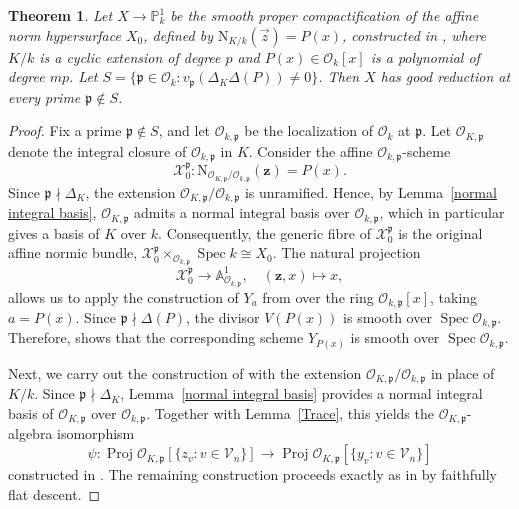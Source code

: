 \documentclass[10pt]{amsart}
\theoremstyle{plain}
\newtheorem{theorem}[thm]{Theorem}
\theoremstyle{definition}
\newcommand{\Nm}{\mathrm{N}}
\begin{document}
\begin{theorem}\label{places of good reduction for normic bundles}
    Let $X \to \mathbb{P}^1_k$ be the smooth proper compactification of the affine norm hypersurface $X_0$, defined by $\Nm_{K/k}(\vec{z})=P(x)$, constructed in \cite[Theorem~1.1]{AB}, where $K/k$ is a cyclic extension of degree $p$ and $P(x)\in \mathcal{O}_k[x]$ is a polynomial of degree $mp$. Let $S=\{\mathfrak{p}\in \mathcal{O}_k : v_{\mathfrak{p}}(\Delta_K\Delta(P))\neq 0\}$. Then $X$ has good reduction at every prime $\mathfrak{p}\notin S$.
\end{theorem}
\begin{proof}
Fix a prime \(\mathfrak p\notin S\), and let
\(\mathcal{O}_{k,\mathfrak p}\) be the localization of
\(\mathcal{O}_k\) at \(\mathfrak p\). Let
\(\mathcal{O}_{K,\mathfrak p}\) denote the integral closure of
\(\mathcal{O}_{k,\mathfrak p}\) in \(K\). Consider the affine
\(\mathcal{O}_{k,\mathfrak p}\)-scheme
\[
\mathcal{X}_{0}^{\mathfrak p}:
\Nm_{\mathcal{O}_{K,\mathfrak p}/
\mathcal{O}_{k,\mathfrak p}}(\mathbf z)=P(x).
\]
Since \(\mathfrak p\nmid\Delta_K\), the extension
\(\mathcal{O}_{K,\mathfrak p}/\mathcal{O}_{k,\mathfrak p}\) is unramified. Hence, by Lemma~\ref{normal integral basis},
\(\mathcal{O}_{K,\mathfrak p}\) admits a normal integral basis over
\(\mathcal{O}_{k,\mathfrak p}\), which in particular gives a basis of \(K\) over \(k\). Consequently, the generic fibre of
\(\mathcal{X}_{0}^{\mathfrak p}\) is the original affine normic bundle, \(\mathcal{X}_{0}^{\mathfrak p}\times_{\mathcal{O}_{k,\mathfrak p}}
\operatorname{Spec}k
\cong
X_0\).
The natural projection
\[
\mathcal{X}_{0}^{\mathfrak p}\longrightarrow
\mathbb{A}^{1}_{\mathcal{O}_{k,\mathfrak p}},
\quad
(\mathbf z,x)\longmapsto x,
\]
allows us to apply the construction of \(Y_a\) from
\cite[Section~3]{AB} over the ring
\(\mathcal{O}_{k,\mathfrak p}[x]\), taking \(a=P(x)\).
Since \(\mathfrak p\nmid\Delta(P)\), the divisor
\(V(P(x))\) is smooth over
\(\operatorname{Spec}\mathcal{O}_{k,\mathfrak p}\). Therefore,
\cite[Corollary~3.4]{AB} shows that the corresponding scheme
\(Y_{P(x)}\) is smooth over
\(\operatorname{Spec}\mathcal{O}_{k,\mathfrak p}\).

Next, we carry out the construction of
\cite[Section~4]{AB} with the extension
\(\mathcal{O}_{K,\mathfrak p}/
\mathcal{O}_{k,\mathfrak p}\) in place of \(K/k\).
Since \(\mathfrak p\nmid\Delta_K\),
Lemma~\ref{normal integral basis} provides a normal integral basis of
\(\mathcal{O}_{K,\mathfrak p}\) over
\(\mathcal{O}_{k,\mathfrak p}\). Together with
Lemma~\ref{Trace}, this yields the
\(\mathcal{O}_{K,\mathfrak p}\)-algebra isomorphism
\[
\psi:
\operatorname{Proj}
\mathcal{O}_{K,\mathfrak p}[\{z_v:v\in\mathcal{V}_n\}]
\longrightarrow
\operatorname{Proj}
\mathcal{O}_{K,\mathfrak p}[\{y_v:v\in\mathcal{V}_n\}]
\]
constructed in \cite{AB}. The remaining construction proceeds exactly as in \cite[Section~4]{AB} by faithfully flat descent.


\end{proof}
\end{document}

